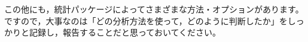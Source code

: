 \documentclass{ltjbook}
\begin{document}
			この他にも，統計パッケージによってさまざまな方法・オプションがあります。ですので，大事なのは「どの分析方法を使って，どのように判断したか」をしっかりと記録し，報告することだと思っておいてください。



\end{document}
